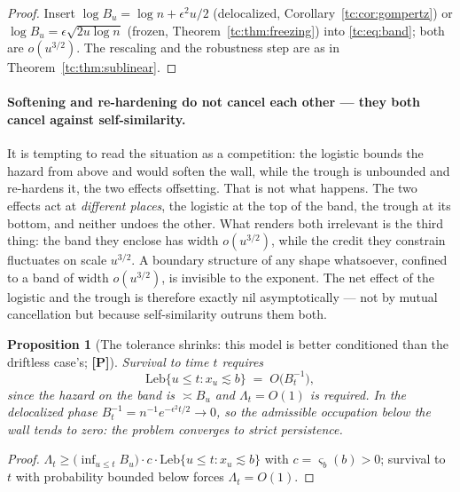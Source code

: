 \documentclass[11pt]{article}
\numberwithin{equation}{section}
\theoremstyle{plain}
\newtheorem{proposition}[theorem]{Proposition}
\theoremstyle{definition}
\theoremstyle{remark}
\begin{document}
\begin{proof}
Insert $\log B_u=\log n+\epsilon^{2}u/2$ (delocalized,
Corollary~\ref{tc:cor:gompertz}) or
$\log B_u=\epsilon\sqrt{2u\log n}$ (frozen,
Theorem~\ref{tc:thm:freezing}) into \eqref{tc:eq:band}; both are
$o(u^{3/2})$. The rescaling and the robustness step are as in
Theorem~\ref{tc:thm:sublinear}.
\end{proof}

\paragraph{Softening and re-hardening do not cancel each other ---
they both cancel against self-similarity.}\label{tc:rem:netcancel}
It is tempting to read the situation as a competition: the logistic
bounds the hazard from above and would soften the wall, while the trough
is unbounded and re-hardens it, the two effects offsetting. That is not
what happens. The two effects act at \emph{different places}, the
logistic at the top of the band, the trough at its bottom, and
neither undoes the other. What renders both irrelevant is the third
thing: the band they enclose has width $o(u^{3/2})$, while the credit
they constrain fluctuates on scale $u^{3/2}$. A boundary structure of
any shape whatsoever, confined to a band of width $o(u^{3/2})$, is
invisible to the exponent. The net effect of the logistic and the trough
is therefore exactly nil asymptotically --- not by mutual cancellation
but because self-similarity outruns them both.

\begin{proposition}[The tolerance shrinks: this model is better
conditioned than the driftless case's; \textbf{[P]}]\label{tc:prop:tolerance}
Survival to time $t$ requires
\begin{equation}\label{tc:eq:tolerance}
\mathrm{Leb}\{u\le t:x_u\lesssim b\}\;=\;O\!\bigl(B_t^{-1}\bigr),
\end{equation}
since the hazard on the band is $\asymp B_u$ and $\Lambda_t=O(1)$ is
required. In the delocalized phase $B_t^{-1}=n^{-1}e^{-\epsilon^{2}t/2}
\to0$, so the admissible occupation below the wall tends to zero: the
problem converges to \emph{strict} persistence.
\end{proposition}

\begin{proof}
$\Lambda_t\ge\bigl(\inf_{u\le t}B_u\bigr)\cdot c\cdot
\mathrm{Leb}\{u\le t:x_u\lesssim b\}$ with $c=\varsigma_b(b)>0$;
survival to $t$ with probability bounded below forces $\Lambda_t=O(1)$.
\end{proof}
\end{document}
